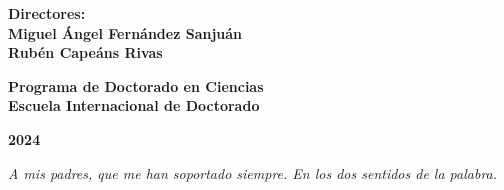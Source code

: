 \documentclass[a4paper,12pt]{newsiambook}
\newcommand{\clearemptydoublepage}{\newpage{\pagestyle{empty}\cleardoublepage}}
\newcommand{\dedica}{\sffamily \slshape}
\begin{document}
\begin{center}
\vspace*{1cm}

\begin{center}
	{ \bf Directores: \\
		\vspace*{0.25cm}
		Miguel \'Angel Fern\'andez Sanju\'an\\
		\vspace*{0.25cm} 
		Rub\'en Cape\'ans Rivas}
\end{center}

\vspace*{1cm}

\begin{center}
	{\bf Programa de Doctorado en Ciencias\\
		Escuela Internacional de Doctorado }
\end{center} 

\vspace*{0.5cm}

\begin{center}
	{\bf \Large 2024}
\end{center}                         %

\end{center}

\clearemptydoublepage \frontmatter

\thispagestyle{empty}


 \clearemptydoublepage


\begin{flushright}

\begin{minipage}[t][5cm][b]{0,5\textwidth}

{\dedica \large A mis padres, que me han soportado siempre. En los dos sentidos de la palabra.}

\end{minipage}
\end{flushright}

\clearemptydoublepage




\setcounter{chapter}{0}


\end{document}
